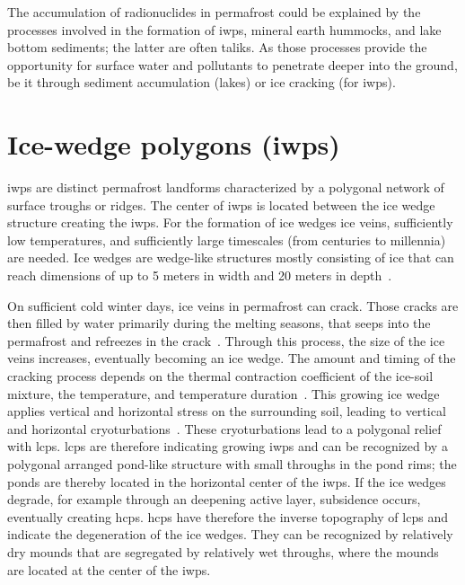 The accumulation of radionuclides in permafrost could be explained by the processes involved in the formation of \glspl{iwp}, mineral earth hummocks, and lake bottom sediments; the latter are often taliks. As those processes provide the opportunity for surface water and pollutants to penetrate deeper into the ground, be it through sediment accumulation (lakes) or ice cracking (for \glspl{iwp}).\@

\section[Ice-wedge polygons (IWPs)]{Ice-wedge polygons (\glspl{iwp})}
\glspl{iwp} are distinct permafrost landforms characterized by a polygonal network of surface troughs or ridges. 
The center of \glspl{iwp} is located between the ice wedge structure creating the \glspl{iwp}. 
For the formation of ice wedges ice veins, sufficiently low temperatures, and sufficiently large timescales (from centuries to millennia) are needed. 
Ice wedges are wedge-like structures mostly consisting of ice that can reach dimensions of up to 5 meters in width and 20 meters in depth~\citep{ulrichQuantifyingWedgeIceVolumes2014}.

On sufficient cold winter days, ice veins in permafrost can crack. 
Those cracks are then filled by water primarily during the melting seasons, that seeps into the permafrost and refreezes in the crack~\citep{fortierLateHoloceneSyngenetic2004,liljedahlPanArcticIcewedgeDegradation2016}. 
Through this process, the size of the ice veins increases, eventually becoming an ice wedge. The amount and timing of the cracking process depends on the thermal contraction coefficient of the ice-soil mixture, the temperature, and temperature duration~\citep{fortierLateHoloceneSyngenetic2004}. 
This growing ice wedge applies vertical and horizontal stress on the surrounding soil, leading to vertical and horizontal cryoturbations~\citep{fortierLateHoloceneSyngenetic2004,liljedahlPanArcticIcewedgeDegradation2016}. These cryoturbations lead to a polygonal relief with \glspl{lcp}. 
\glspl{lcp} are therefore indicating growing \glspl{iwp} and can be recognized by a polygonal arranged pond-like structure with small throughs in the pond rims; the ponds are thereby located in the horizontal center of the \glspl{iwp}.\@
If the ice wedges degrade, for example through an deepening active layer, subsidence occurs, eventually creating \glspl{hcp}. 
\glspl{hcp} have therefore the inverse topography of \glspl{lcp} and indicate the degeneration of the ice wedges. They can be recognized by relatively dry mounds that are segregated by relatively wet throughs, where the mounds are located at the center of the \glspl{iwp}.\@

